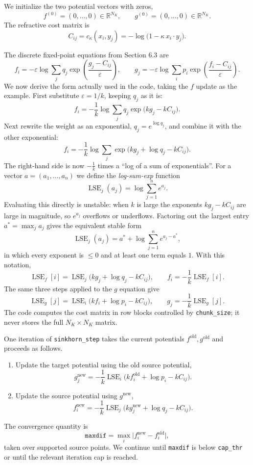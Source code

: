 \documentclass{article}
\begin{document}
We initialize the two potential vectors with zeros,
\[
    f^{(0)}=(0,\ldots,0)\in\mathbb{R}^{N_K},
    \qquad
    g^{(0)}=(0,\ldots,0)\in\mathbb{R}^{N_K}.
\]
The refractive cost matrix is
\[
    C_{ij}=c_\kappa(x_i,y_j)
    =-\log\bigl(1-\kappa\,x_i\cdot y_j\bigr).
\]

The discrete fixed-point equations from Section 6.3 are
\[
    f_i=-\varepsilon\log\sum_j q_j
        \exp\!\left(\frac{g_j-C_{ij}}{\varepsilon}\right),
    \qquad
    g_j=-\varepsilon\log\sum_i p_i
        \exp\!\left(\frac{f_i-C_{ij}}{\varepsilon}\right).
\]
We now derive the form actually used in the code, taking the $f$ update as
the example.  First substitute $\varepsilon=1/k$, keeping $q_j$ as it is:
\[
    f_i=-\frac1k\log\sum_j q_j\exp\bigl(kg_j-kC_{ij}\bigr).
\]
Next rewrite the weight as an exponential, $q_j=e^{\log q_j}$, and combine it
with the other exponential:
\[
    f_i=-\frac1k\log\sum_j \exp\bigl(kg_j+\log q_j-kC_{ij}\bigr).
\]
The right-hand side is now $-\tfrac1k$ times a ``log of a sum of
exponentials''.  For a vector $a=(a_1,\ldots,a_n)$ we define the
\emph{log-sum-exp} function
\[
    \operatorname{LSE}_j(a_j)=\log\sum_{j=1}^{n}e^{a_j}.
\]
Evaluating this directly is unstable: when $k$ is large the exponents
$kg_j-kC_{ij}$ are large in magnitude, so $e^{a_j}$ overflows or underflows.
Factoring out the largest entry $a^*=\max_j a_j$ gives the equivalent stable
form
\[
    \operatorname{LSE}_j(a_j)=a^*+\log\sum_{j=1}^{n}e^{a_j-a^*},
\]
in which every exponent is $\le 0$ and at least one term equals $1$.  With
this notation,
\[
    \operatorname{LSE}_f[i]=\operatorname{LSE}_j\bigl(kg_j+\log q_j-kC_{ij}\bigr),
    \qquad
    f_i=-\frac{1}{k}\operatorname{LSE}_f[i].
\]
The same three steps applied to the $g$ equation give
\[
    \operatorname{LSE}_g[j]=\operatorname{LSE}_i\bigl(kf_i+\log p_i-kC_{ij}\bigr),
    \qquad
    g_j=-\frac{1}{k}\operatorname{LSE}_g[j].
\]
The code computes the cost matrix in row blocks controlled by
\texttt{chunk\_size}; it never stores the full $N_K\times N_K$ matrix.

One iteration of \texttt{sinkhorn\_step} takes the current potentials
$f^{\mathrm{old}},g^{\mathrm{old}}$ and proceeds as follows.
\begin{enumerate}
    \item Update the target potential using the old source potential,
    \[
        g^{\mathrm{new}}_j=-\frac1k\operatorname{LSE}_i\bigl(kf^{\mathrm{old}}_i+\log p_i-kC_{ij}\bigr).
    \]
    \item Update the source potential using $g^{\mathrm{new}}$,
    \[
        f^{\mathrm{new}}_i=-\frac1k\operatorname{LSE}_j\bigl(kg^{\mathrm{new}}_j+\log q_j-kC_{ij}\bigr).
    \]
\end{enumerate}
The convergence quantity is
\[
    \texttt{maxdif}=\max_i\bigl|f^{\mathrm{new}}_i-f^{\mathrm{old}}_i\bigr|,
\]
taken over supported source points.  We continue until \texttt{maxdif} is
below \texttt{cap\_thr} or until the relevant iteration cap is reached.
\end{document}
